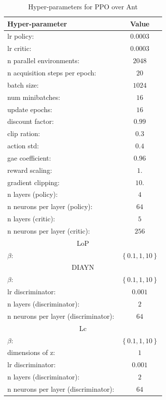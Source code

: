 \begin{table}[h!]
\centering

\label{table:ant_test_setting}
\end{table}

\newpage

\begin{table}[h!]
\begin{center}
\begin{tabular}{l|c} \toprule
   \textbf{Hyper-parameter} & \textbf{Value} \\ \hline
    lr policy: &  $0.0003$\\
    lr critic: &  $0.0003$\\
    n parallel environments: & $2048$ \\
    n acquisition steps per epoch: & $20$ \\
    batch size: & $1024$ \\
    num minibatches: & $16$ \\
    update epochs: & $16$ \\
    discount factor: &  $0.99$\\
    clip ration: &  $0.3$\\
    action std: &  $0.4$\\
    gae coefficient: &  $0.96$\\
    reward scaling: &  $1.$\\
    gradient clipping: & $10.$ \\ 
    n layers (policy): & $4$ \\ 
    n neurons per layer (policy): & $64$ \\
    n layers (critic): & $5$ \\ 
    n neurons per layer (critic): & $256$ \\
 \toprule
    \multicolumn{2}{c}{LoP} \\ 
    \hline
    $\beta$: & $\left \{ 0.1,1,10 \right \}$ \\
    \toprule
    \multicolumn{2}{c}{DIAYN} \\ 
    \hline
    $\beta$: & $\left \{ 0.1,1,10 \right \}$\\
    lr discriminator: &  $0.001$\\
    n layers (discriminator): & $2$ \\ 
    n neurons per layer (discriminator): &  $64$\\\hline
    \multicolumn{2}{c}{Lc} \\ 
    \hline
    $\beta$: & $\left \{ 0.1,1,10 \right \}$ \\
    dimensions of z: &  $1$\\
    lr discriminator: &  $0.001$\\
    n layers (discriminator): & $2$ \\ 
    n neurons per layer (discriminator): &  $64$\\\hline
\end{tabular}
\end{center}
\caption{Hyper-parameters for PPO over Ant}
\label{table:hp_ant}
\end{table}

